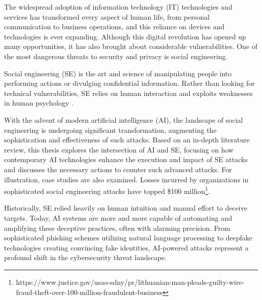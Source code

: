 \begin{comment}
    - Johdannon pituus määräytyy suhteessa koko kirjoitelman pituuteen. Parisivuinen kirjoitus ei erikseen otsikoitua johdantoa kaipaa, sillä se itsessään on laajennettu tiivistelmä. Kymmensivuisen kirjoituksen johdanto voi olla vaikkapa sivun tai puolentoista mittainen. Pro gradu -tutkielman 50-70-sivuiseen kokonaisuuteen tuntuu 2-4-sivuinen johdanto kohtuulliselta.

    - Johdanto kertoo siis lyhyessä, yleistajuisessa muodossa koko kirjoitelman kysymyksenasettelun, juonen sekä tulokset ja johtopäätelmät. Tämän luettuaan lukija voi päätellä, haluaako syventyä asiaan tarkemmin lukemalla koko kirjoituksen.

\end{comment}

The widespread adoption of information technology (IT) technologies and services has transformed every aspect of human life, from personal communication to business operations, and this reliance on devices and technologies is ever expanding. Although this digital revolution has opened up many opportunities, it has also brought about considerable vulnerabilities. One of the most dangerous threats to security and privacy is social engineering.

Social engineering (SE) is the art and science of manipulating people into performing actions or divulging confidential information. Rather than looking for technical vulnerabilities, SE relies on human interaction and exploits weaknesses in human psychology \citep{wangDefiningSocialEngineering2020}.

With the advent of modern artificial intelligence (AI), the landscape of social engineering is undergoing significant transformation, augmenting the sophistication and effectiveness of such attacks. Based on an in-depth literature review, this thesis explores the intersection of AI and SE, focusing on how contemporary AI technologies enhance the execution and impact of SE attacks and discusses the necessary actions to counter such advanced attacks. For illustration, case studies are also examined. Losses incurred by organizations in sophisticated social engineering attacks have topped \$100 million\footnote{https://www.justice.gov/usao-sdny/pr/lithuanian-man-pleads-guilty-wire-fraud-theft-over-100-million-fraudulent-business}.

Historically, SE relied heavily on human intuition and manual effort to deceive targets. Today, AI systems are more and more capable of automating and amplifying these deceptive practices, often with alarming precision. From sophisticated phishing schemes utilizing natural language processing to deepfake technologies creating convincing fake identities, AI-powered attacks represent a profound shift in the cybersecurity threat landscape.

